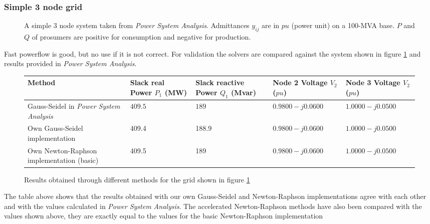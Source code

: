\subsubsection{Simple 3 node grid}

\begin{figure}[H]
    \centering
    
    \caption{
        A simple 3 node system taken from \textit{Power System Analysis}\autocite{power_system_analysis}.
        Admittances $y_{ij}$ are in $pu$ (power unit) on a 100-MVA base.
        $P$ and $Q$ of prosumers are positive for consumption and negative for production.
    }
    \label{fig:pf:3_node_system}
\end{figure}


Fast powerflow is good, but no use if it is not correct. For validation
the solvers are compared against the system shown in figure \ref{fig:pf:3_node_system} and results
provided in \textit{Power System Analysis}\autocite{power_system_analysis}.

\begin{figure}[H]
    \begin{center}
        \begin{tabular}{m{3cm} | m{2.5cm} m{2.5cm} m{2.5cm} m{2.5cm}}
            Method & Slack real Power $P_1$ (MW) & Slack reactive Power $Q_1$ (Mvar) & Node 2 Voltage $V_2$ ($pu$) & Node 3 Voltage $V_2$ ($pu$)\\
            \hline
            Gauss-Seidel in \textit{Power System Analysis}\autocite{power_system_analysis} & $409.5$ & $189$ & $0.9800 - j0.0600$ & $1.0000 - j0.0500$\\
            \hline
            Own Gauss-Seidel implementation & 409.4 & 188.9 & $0.9800-j0.0600$ & $1.0000 - j0.0500$ \\
            \hline
            Own Newton-Raphson implementation (basic) & 409.5 & 189 & $0.9800-j0.0600$ & $1.0000 - j0.0500$ \\
        \end{tabular}
    \end{center}
    \caption{Results obtained through different methods for the grid shown in figure \ref{fig:pf:3_node_system}}
\end{figure}

The table above shows that the results obtained with our own Gauss-Seidel and Newton-Raphson
implementations agree with each other and with the values calculated in \textit{Power System Analysis}\autocite{power_system_analysis}. The accelerated
Newton-Raphson methods have also been compared with the values shown above, they are exactly equal to the values 
for the basic Newton-Raphson implementation

